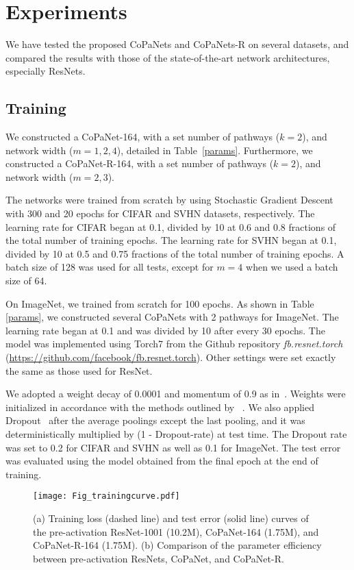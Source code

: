 \documentclass[wcp]{jmlr}
\begin{document}
\section{Experiments}
We have tested the proposed CoPaNets and CoPaNets-R on several datasets, and compared the results with those of the state-of-the-art network architectures, especially ResNets.

\subsection{Training}

We constructed a CoPaNet-164, with a set number of pathways ($k=2$), and network width ($m=1,2,4$), detailed in Table~\ref{params}. 
Furthermore, we constructed a CoPaNet-R-164, with a set number of pathways ($k=2$), and network width ($m=2,3$). 

The networks were trained from scratch by using Stochastic Gradient Descent with 300 and 20 epochs for CIFAR and SVHN datasets, respectively. 
The learning rate for CIFAR began at 0.1, divided by 10 at 0.6 and 0.8 fractions of the total number of training epochs. 
The learning rate for SVHN began at 0.1, divided by 10 at 0.5 and 0.75 fractions of the total number of training epochs. 
A batch size of 128 was used for all tests, except for $m=4$ when we used a batch size of 64. 

On ImageNet, we trained from scratch for 100 epochs.
As shown in Table \ref{params}, we constructed several CoPaNets with 2 pathways for ImageNet. 
The learning rate began at 0.1 and was divided by 10 after every 30 epochs.
The model was implemented using Torch7 from the Github repository \textit{fb.resnet.torch} (\url{https://github.com/facebook/fb.resnet.torch}).
Other settings were set exactly the same as those used for ResNet.

We adopted a weight decay of 0.0001 and momentum of 0.9 as in~\citep{he2015deep}.
Weights were initialized in accordance with the methods outlined by ~\cite{he2015delving}. 
We also applied Dropout~\citep{srivastava2014dropout} after the average poolings except the last pooling, and it was deterministically multiplied by (1 - Dropout-rate) at test time.
The Dropout rate was set to 0.2 for CIFAR and SVHN as well as 0.1 for ImageNet. 
The test error was evaluated using the model obtained from the final epoch at the end of training.

\begin{figure*}
\begin{center}
	\texttt{[image: Fig\_trainingcurve.pdf]}
\end{center}
   \caption{ (a) Training loss (dashed line) and test error (solid line) curves of the pre-activation ResNet-1001 (10.2M), CoPaNet-164 (1.75M), and  CoPaNet-R-164 (1.75M). (b) Comparison of the parameter efficiency between pre-activation ResNets, CoPaNet, and CoPaNet-R.}
\label{curve}
\end{figure*}
\end{document}
